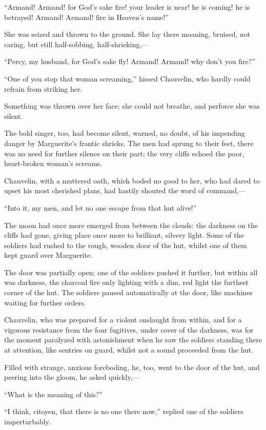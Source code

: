 \documentclass[paper=5.5in:8.5in,BCOR=7mm,twoside,DIV=calc,12pt,usegeometry,chapterprefix,endperiod,headings=big]{scrbook}
\begin{document}
\enquote{Armand! Armand! for God's sake fire! your leader is near! he is coming! he is betrayed! Armand! Armand! fire in Heaven's name!}

She was seized and thrown to the ground. She lay there moaning, bruised, not caring, but still half-sobbing, half-shrieking,---

\enquote{Percy, my husband, for God's sake fly! Armand! Armand! why don't you fire?}

\enquote{One of you stop that woman screaming,} hissed Chauvelin, who hardly could refrain from striking her.

Something was thrown over her face; she could not breathe, and perforce she was silent.

The bold singer, too, had become silent, warned, no doubt, of his impending danger by Marguerite's frantic shrieks. The men had sprung to their feet, there was no need for further silence on their part; the very cliffs echoed the poor, heart-broken woman's screams.

Chauvelin, with a muttered oath, which boded no good to her, who had dared to upset his most cherished plans, had hastily shouted the word of command,---

\enquote{Into it, my men, and let no one escape from that hut alive!}

The moon had once more emerged from between the clouds: the darkness on the cliffs had gone, giving place once more to brilliant, silvery light. Some of the soldiers had rushed to the rough, wooden door of the hut, whilst one of them kept guard over Marguerite.

The door was partially open; one of the soldiers pushed it further, but within all was darkness, the charcoal fire only lighting with a dim, red light the furthest corner of the hut. The soldiers paused automatically at the door, like machines waiting for further orders.

Chauvelin, who was prepared for a violent onslaught from within, and for a vigorous resistance from the four fugitives, under cover of the darkness, was for the moment paralyzed with astonishment when he saw the soldiers standing there at attention, like sentries on guard, whilst not a sound proceeded from the hut.

Filled with strange, anxious foreboding, he, too, went to the door of the hut, and peering into the gloom, he asked quickly,---

\enquote{What is the meaning of this?}

\enquote{I think, citoyen, that there is no one there now,} replied one of the soldiers imperturbably.
\end{document}
